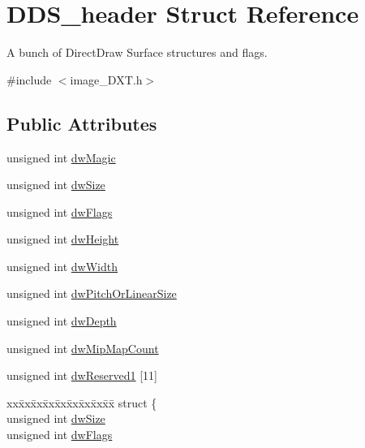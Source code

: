 \hypertarget{struct_d_d_s__header}{}\section{D\+D\+S\+\_\+header Struct Reference}
\label{struct_d_d_s__header}


A bunch of Direct\+Draw Surface structures and flags.  




{\ttfamily \#include $<$image\+\_\+\+D\+X\+T.\+h$>$}

\subsection*{Public Attributes}
\begin{DoxyCompactItemize}
\item 
unsigned int \hyperlink{struct_d_d_s__header_ae92b8a57c39f167862e6fc963bbe3a22}{dw\+Magic}
\item 
unsigned int \hyperlink{struct_d_d_s__header_a0547c8dec53be12586207d350a66ee67}{dw\+Size}
\item 
unsigned int \hyperlink{struct_d_d_s__header_a7703db822d8a22fa9a1f806e9ec2d6d9}{dw\+Flags}
\item 
unsigned int \hyperlink{struct_d_d_s__header_a70fb20dd52718b1334b3a9c9ca70145f}{dw\+Height}
\item 
unsigned int \hyperlink{struct_d_d_s__header_a91d4282a7b838a8f691a7504e56223f0}{dw\+Width}
\item 
unsigned int \hyperlink{struct_d_d_s__header_a679fd9c7706adab8eb5b9470616a90a9}{dw\+Pitch\+Or\+Linear\+Size}
\item 
unsigned int \hyperlink{struct_d_d_s__header_ab458ba3768aa3aed2899e947946131c6}{dw\+Depth}
\item 
unsigned int \hyperlink{struct_d_d_s__header_a82dc7ae0f612d81d2aa69c3b5f83dd2d}{dw\+Mip\+Map\+Count}
\item 
unsigned int \hyperlink{struct_d_d_s__header_a9aede5465e4dffe6308d6dfedc164ee9}{dw\+Reserved1} \mbox{[}11\mbox{]}
\item 
\begin{tabbing}
xx\=xx\=xx\=xx\=xx\=xx\=xx\=xx\=xx\=\kill
struct \{\\
\>unsigned int \hyperlink{struct_d_d_s__header_a0547c8dec53be12586207d350a66ee67}{dwSize}\\
\>unsigned int \hyperlink{struct_d_d_s__header_a7703db822d8a22fa9a1f806e9ec2d6d9}{dwFlags}\\

\end{tabbing}
\end{DoxyCompactItemize}
